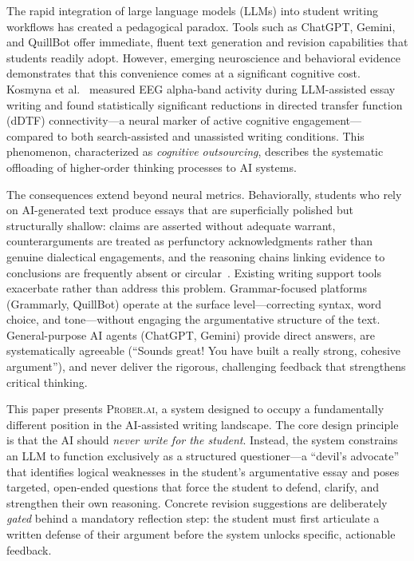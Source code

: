 \documentclass[11pt,a4paper]{article}
\begin{document}
The rapid integration of large language models (LLMs) into student writing workflows has created a pedagogical paradox. Tools such as ChatGPT, Gemini, and QuillBot offer immediate, fluent text generation and revision capabilities that students readily adopt. However, emerging neuroscience and behavioral evidence demonstrates that this convenience comes at a significant cognitive cost. Kosmyna et al.~\cite{kosmyna2025brain} measured EEG alpha-band activity during LLM-assisted essay writing and found statistically significant reductions in directed transfer function (dDTF) connectivity---a neural marker of active cognitive engagement---compared to both search-assisted and unassisted writing conditions. This phenomenon, characterized as \textit{cognitive outsourcing}, describes the systematic offloading of higher-order thinking processes to AI systems.

The consequences extend beyond neural metrics. Behaviorally, students who rely on AI-generated text produce essays that are superficially polished but structurally shallow: claims are asserted without adequate warrant, counterarguments are treated as perfunctory acknowledgments rather than genuine dialectical engagements, and the reasoning chains linking evidence to conclusions are frequently absent or circular~\cite{bi2026pedagogy}. Existing writing support tools exacerbate rather than address this problem. Grammar-focused platforms (Grammarly, QuillBot) operate at the surface level---correcting syntax, word choice, and tone---without engaging the argumentative structure of the text. General-purpose AI agents (ChatGPT, Gemini) provide direct answers, are systematically agreeable (``Sounds great! You have built a really strong, cohesive argument''), and never deliver the rigorous, challenging feedback that strengthens critical thinking.

This paper presents \textsc{Prober.ai}, a system designed to occupy a fundamentally different position in the AI-assisted writing landscape. The core design principle is that the AI should \textit{never write for the student}. Instead, the system constrains an LLM to function exclusively as a structured questioner---a ``devil's advocate'' that identifies logical weaknesses in the student's argumentative essay and poses targeted, open-ended questions that force the student to defend, clarify, and strengthen their own reasoning. Concrete revision suggestions are deliberately \textit{gated} behind a mandatory reflection step: the student must first articulate a written defense of their argument before the system unlocks specific, actionable feedback.
\end{document}
